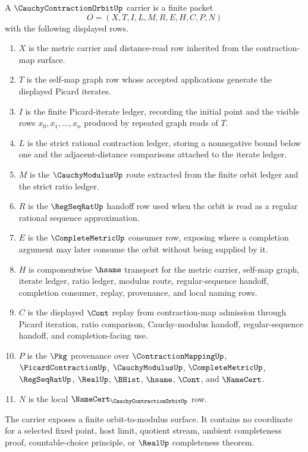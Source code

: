 \begin{definition}
\label{def:cauchy-contraction-orbit-carrier}
A $\CauchyContractionOrbitUp$ carrier is a finite packet
$$
O=(X,T,I,L,M,R,E,H,C,P,N)
$$
with the following displayed rows.
\begin{enumerate}
\item $X$ is the metric carrier and distance-read row inherited from the contraction-map surface.
\item $T$ is the self-map graph row whose accepted applications generate the displayed Picard iterates.
\item $I$ is the finite Picard-iterate ledger, recording the initial point and the visible rows $x_0,x_1,\ldots,x_n$ produced by repeated graph reads of $T$.
\item $L$ is the strict rational contraction ledger, storing a nonnegative bound below one and the adjacent-distance comparisons attached to the iterate ledger.
\item $M$ is the $\CauchyModulusUp$ route extracted from the finite orbit ledger and the strict ratio ledger.
\item $R$ is the $\RegSeqRatUp$ handoff row used when the orbit is read as a regular rational sequence approximation.
\item $E$ is the $\CompleteMetricUp$ consumer row, exposing where a completion argument may later consume the orbit without being supplied by it.
\item $H$ is componentwise $\hsame$ transport for the metric carrier, self-map graph, iterate ledger, ratio ledger, modulus route, regular-sequence handoff, completion consumer, replay, provenance, and local naming rows.
\item $C$ is the displayed $\Cont$ replay from contraction-map admission through Picard iteration, ratio comparison, Cauchy-modulus handoff, regular-sequence handoff, and completion-facing use.
\item $P$ is the $\Pkg$ provenance over $\ContractionMappingUp$, $\PicardContractionUp$, $\CauchyModulusUp$, $\CompleteMetricUp$, $\RegSeqRatUp$, $\RealUp$, $\BHist$, $\hsame$, $\Cont$, and $\NameCert$.
\item $N$ is the local $\NameCert_{\CauchyContractionOrbitUp}$ row.
\end{enumerate}
The carrier exposes a finite orbit-to-modulus surface. It contains no coordinate for a selected fixed point, host limit, quotient stream, ambient completeness proof, countable-choice principle, or $\RealUp$ completeness theorem.
\end{definition}

